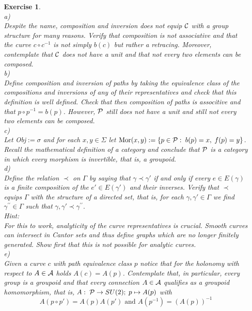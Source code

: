 \documentclass[12pt]{report}
\newtheorem{Exercise}{Exercise}[section]
\def\be{\begin{equation}}
\def\ee{\end{equation}}
\def\a{{\cal A}}
\begin{document}
%
\begin{Exercise} \label{ex2.1.2.1} ~~~\\
a)\\
Despite the name, composition and inversion does not equip $\cal C$
with a group structure for many reasons. Verify that composition is 
not associative and that the curve $c\circ c^{-1}$ is not simply 
$b(c)$ but rather a retracing. Moreover, contemplate that $\cal C$ 
does not have a unit and that not every two elements can be composed.\\
b)\\
Define composition and inversion of paths by taking the equivalence class 
of the compositions and inversions of any of their representatives and 
check that this definition is well defined. Check that then
composition of paths is associtive and that $p\circ p^{-1}=b(p)$.
However, $\cal P$ still does not have a unit and still not every
two elements can be composed.\\
c)\\
Let Obj$:=\sigma$ and for each $x,y\in\Sigma$ let 
$\mbox{Mor}(x,y):=\{p\in {\cal P}:\;b(p)=x,\;f(p)=y\}$. Recall the 
mathematical definition of a category and conclude that $\cal P$
is a category in which every morphism is invertible, that is, 
a {\it groupoid}.\\
d)\\
Define the relation $\prec$ on $\Gamma$ by saying that 
$\gamma\prec\gamma'$ if and only if every $e\in E(\gamma)$ is a finite 
composition of the $e'\in E(\gamma')$ and their inverses. Verify that
$\prec$ equips $\Gamma$ with the structure of a directed set, that is,
for each $\gamma,\gamma'\in\Gamma$ we find $\gamma^{\prime\prime}\in 
\Gamma$ such that $\gamma,\gamma'\prec \gamma^{\prime\prime}$. \\
Hint:\\
For this to work, analyticity of the curve representatives is crucial.
Smooth curves can intersect in Cantor sets and thus define graphs which 
are no longer finitely generated. Show first that this is not possible for 
analytic curves.\\
e)\\
Given a curve $c$ with path equivalence class $p$ notice that for 
the holonomy with respect to $A\in \a$ holds $A(c)=A(p)$.
Contemplate that, in particular, every group is a groupoid and that every 
connection $A\in \a$ qualifies as a groupoid homomorphism, that is,
$A:\;{\cal P}\to SU(2);\;p\mapsto A(p)$ with 
\be \label{ex2.1.2.1a}
A(p\circ p')=A(p)A(p') \mbox{ and } A(p^{-1})=(A(p))^{-1}
\ee
\end{Exercise}
\end{document}
